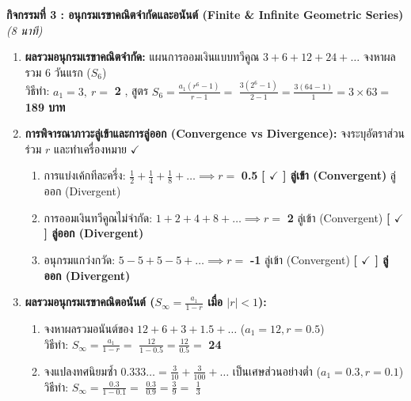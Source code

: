 \documentclass[a4paper,12pt]{article}
\newcommand{\ans}[1]{\textbf{\color{ans}#1}}
\begin{document}
\noindent\textbf{กิจกรรมที่ 3 : อนุกรมเรขาคณิตจำกัดและอนันต์ (Finite \& Infinite Geometric Series)} \hfill \textit{(8 นาที)}
\begin{enumerate}[label=\arabic*)]
  \item \textbf{ผลรวมอนุกรมเรขาคณิตจำกัด:} แผนการออมเงินแบบทวีคูณ $3 + 6 + 12 + 24 + \dots$ จงหาผลรวม 6 วันแรก ($S_6$)\\[0.15em]
        วิธีทำ: $a_1 = 3, \ r = $ \ans{2} , \quad สูตร $S_6 = \frac{a_1(r^6 - 1)}{r - 1} =$ \ans{$\frac{3(2^6 - 1)}{2 - 1} = \frac{3(64 - 1)}{1} = 3 \times 63 =$} \ans{189 บาท}
  \item \textbf{การพิจารณาภาวะลู่เข้าและการลู่ออก (Convergence vs Divergence):} จงระบุอัตราส่วนร่วม $r$ และทำเครื่องหมาย $\checkmark$
        \begin{enumerate}[label=(\alph*),itemsep=2pt]
          \item การแบ่งเค้กทีละครึ่ง: $\frac{1}{2} + \frac{1}{4} + \frac{1}{8} + \dots \implies r = $ \ans{0.5} \quad \ans{[ $\checkmark$ ] ลู่เข้า (Convergent)} \quad [ \ ] ลู่ออก (Divergent)
          \item การออมเงินทวีคูณไม่จำกัด: $1 + 2 + 4 + 8 + \dots \implies r = $ \ans{2} \quad [ \ ] ลู่เข้า (Convergent) \quad \ans{[ $\checkmark$ ] ลู่ออก (Divergent)}
          \item อนุกรมแกว่งกวัด: $5 - 5 + 5 - 5 + \dots \implies r = $ \ans{-1} \quad [ \ ] ลู่เข้า (Convergent) \quad \ans{[ $\checkmark$ ] ลู่ออก (Divergent)}
        \end{enumerate}
  \item \textbf{ผลรวมอนุกรมเรขาคณิตอนันต์ ($S_\infty = \frac{a_1}{1 - r}$ เมื่อ $|r| < 1$):}
        \begin{enumerate}[label=(\alph*),itemsep=2pt]
          \item จงหาผลรวมอนันต์ของ $12 + 6 + 3 + 1.5 + \dots$ ($a_1 = 12, r = 0.5$)\\[0.1em]
                วิธีทำ: $S_\infty = \frac{a_1}{1 - r} =$ \ans{$\frac{12}{1 - 0.5} = \frac{12}{0.5} =$} \ans{24}
          \item จงแปลงทศนิยมซ้ำ $0.333\dots = \frac{3}{10} + \frac{3}{100} + \dots$ เป็นเศษส่วนอย่างต่ำ ($a_1 = 0.3, r = 0.1$)\\[0.1em]
                วิธีทำ: $S_\infty = \frac{0.3}{1 - 0.1} =$ \ans{$\frac{0.3}{0.9} = \frac{3}{9} =$} \ans{$\frac{1}{3}$}
        \end{enumerate}
\end{enumerate}
\vspace{0.2em}
\end{document}
